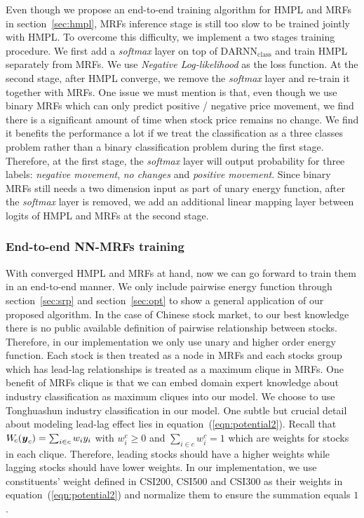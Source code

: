 \documentclass[sigconf,anonymous,review]{acmart}
\renewcommand{\cite}{\citep}
\begin{document}
Even though we propose an end-to-end training algorithm for HMPL
and MRFs in section~\ref{sec:hmpl}, MRFs inference stage is still
too slow to be trained jointly with HMPL. To overcome this
difficulty, we implement a two stages training procedure. We
first add a \emph{softmax} layer on top of
$\text{DARNN}_{\text{class}}$ and train HMPL separately from
MRFs. We use \emph{Negative Log-likelihood} as the loss function.
At the second stage, after HMPL converge, we remove the
\emph{softmax} layer and re-train it together with MRFs. One
issue we must mention is that, even though we use binary MRFs
which can only predict positive / negative price movement, we
find there is a significant amount of time when stock price
remains no change. We find it benefits the performance a lot if
we treat the classification as a three classes problem rather
than a binary classification problem during the first stage.
Therefore, at the first stage, the \emph{softmax} layer will
output probability for three labels: \emph{negative movement},
\emph{no changes} and \emph{positive movement}. Since binary MRFs
still needs a two dimension input as part of unary energy
function, after the \emph{softmax} layer is removed, we add an
additional linear mapping layer between logits of HMPL and MRFs
at the second stage.

\subsubsection{End-to-end NN-MRFs training}
\label{sec:mrf_train}

With converged HMPL and MRFs at hand, now we can go forward to train
them in an end-to-end manner. We only include pairwise energy function through
section~\ref{sec:srp} and section~\ref{sec:opt} to show a general
application of our proposed algorithm. In the case of Chinese
stock market, to our best knowledge there is no public available
definition of pairwise relationship between stocks. Therefore, in
our implementation we only use unary and higher order energy
function. Each stock is then treated as a node in MRFs and each
stocks group which has lead-lag relationships is treated as a
maximum clique in MRFs. One benefit of MRFs clique is that we can
embed domain expert knowledge about industry classification as
maximum cliques into our model. We choose to use Tonghuashun
industry classification \cite{ths} in our model. One subtle but
crucial detail about modeling lead-lag effect lies in
equation~(\ref{eqn:potential2}). Recall that $W_{\!c}({\boldsymbol{y}}_c) =
\sum_{i \in c} w_i y_i$ with $w^c_i \geq 0$ and $\sum_{i \in c}
w^c_i = 1$ which are weights for stocks in each clique.
Therefore, leading stocks should have a higher weights while
lagging stocks should have lower weights. In our implementation,
we use constituents' weight defined in CSI200, CSI500 and CSI300
as their weights in equation~(\ref{eqn:potential2}) and normalize
them to ensure the summation equals $1$.
\end{document}
